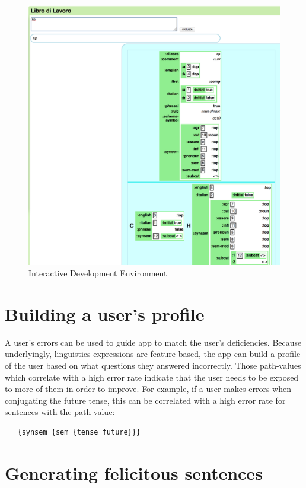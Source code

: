 \documentclass[11pt]{article}
\begin{document}
\begin{figure}[H]
  \includegraphics[scale=0.20]{np}
  \caption{Interactive Development Environment}
\end{figure}

\section{Building a user's profile}

A user's errors can be used to guide app to match the user's
deficiencies. Because underlyingly, linguistics expressions are
feature-based, the app can build a profile of the user based on what
questions they answered incorrectly. Those path-values which
correlate with a high error rate indicate that the user needs to be
exposed to more of them in order to improve. For example, if a user
makes errors when conjugating the future tense, this can be correlated
with a high error rate for sentences with the path-value:

\begin{verbatim}
   {synsem {sem {tense future}}}
 \end{verbatim}

\section{Generating felicitous sentences}
\end{document}
